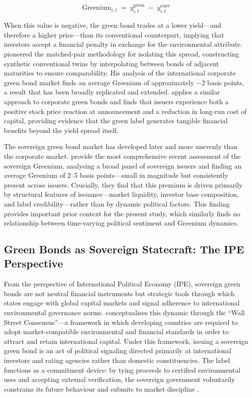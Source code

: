 \documentclass[12pt,a4paper]{article}
\begin{document}
\begin{equation}
\text{Greenium}_{i,t} \;=\; y^{\text{green}}_{i,t} \;-\; y^{\text{conv}}_{i,t}
\label{eq:greenium_lit}
\end{equation}

\noindent When this value is negative, the green bond trades at a lower yield---and therefore a higher price---than its conventional counterpart, implying that investors accept a financial penalty in exchange for the environmental attribute. \citet{Zerbib2019} pioneered the matched-pair methodology for isolating this spread, constructing synthetic conventional twins by interpolating between bonds of adjacent maturities to ensure comparability. His analysis of the international corporate green bond market finds an average Greenium of approximately $-2$ basis points, a result that has been broadly replicated and extended. \citet{Flammer2021} applies a similar approach to corporate green bonds and finds that issuers experience both a positive stock price reaction at announcement and a reduction in long-run cost of capital, providing evidence that the green label generates tangible financial benefits beyond the yield spread itself.

The sovereign green bond market has developed later and more unevenly than the corporate market. \citet{Panizza2025} provide the most comprehensive recent assessment of the sovereign Greenium, analysing a broad panel of sovereign issuers and finding an average Greenium of 2--5 basis points---small in magnitude but consistently present across issuers. Crucially, they find that this premium is driven primarily by structural features of issuance---market liquidity, investor base composition, and label credibility---rather than by dynamic political factors. This finding provides important prior context for the present study, which similarly finds no relationship between time-varying political sentiment and Greenium dynamics.


\subsection{Green Bonds as Sovereign Statecraft: The IPE Perspective}

From the perspective of International Political Economy (IPE), sovereign green bonds are not neutral financial instruments but strategic tools through which states engage with global capital markets and signal adherence to international environmental governance norms. \citet{Gabor2021} conceptualises this dynamic through the ``Wall Street Consensus''---a framework in which developing countries are required to adopt market-compatible environmental and financial standards in order to attract and retain international capital. Under this framework, issuing a sovereign green bond is an act of political signaling directed primarily at international investors and rating agencies rather than domestic constituencies. The label functions as a commitment device: by tying proceeds to certified environmental uses and accepting external verification, the sovereign government voluntarily constrains its future behaviour and submits to market discipline \citep{Gabor2021}.
\end{document}
